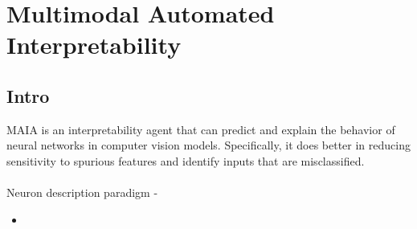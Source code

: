 \section{Multimodal Automated Interpretability}
\subsection{Intro}
MAIA is an interpretability agent that can predict and explain the behavior of neural networks in computer vision models. 
Specifically, it does better in reducing sensitivity to spurious features and identify inputs that are misclassified.\\
\\
Neuron description paradigm - 
\begin{itemize}
    \item 
\end{itemize}

